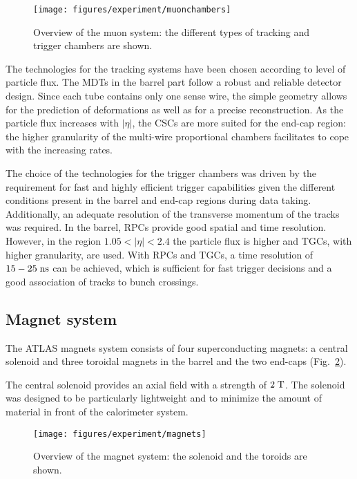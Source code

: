 \begin{figure}[ht]
\begin{center}
\texttt{[image: figures/experiment/muonchambers]}
\caption[Overview of the muon system]{
  Overview of the muon system:
  the different types of tracking and trigger chambers are shown.}
\label{fig:muons}
\end{center}
\end{figure}

The technologies for the tracking systems have been chosen according to
level of particle flux.
The MDTs in the barrel part follow a robust and reliable detector design.
Since each tube contains only one sense wire, the simple geometry
allows for the prediction of deformations as well as for a precise reconstruction.
As the particle flux increases with $|\eta|$, 
the CSCs are more suited for the end-cap region:
the higher granularity of the multi-wire proportional chambers 
facilitates to cope with the increasing rates.

The choice of the technologies for the trigger chambers was driven 
by the requirement for fast and highly efficient trigger capabilities
given the different conditions present in the barrel and end-cap regions during data taking.
Additionally, an adequate resolution of the transverse momentum of the tracks was required.
In the barrel, RPCs provide good spatial and time resolution.
However, in the region \mbox{$1.05 < |\eta| < 2.4$}  the particle flux
is higher and TGCs, with higher granularity, are used.
With RPCs and TGCs, a time resolution of \mbox{$15 - 25 \; \mathrm{ns}$} can be
achieved, 
which is sufficient for fast trigger decisions and a good association of
tracks to bunch crossings.

\subsection{Magnet system}
\label{sec:magnets}

The ATLAS magnets system consists of four superconducting
magnets: a central solenoid and three toroidal magnets in the barrel and the
two end-caps (Fig.~\ref{fig:magnets}).

The central solenoid provides an axial field with a strength of \mbox{$2 \; \mathrm{T}$}.
The solenoid was designed to be particularly lightweight and to
minimize the amount of material in front of the calorimeter system.

\begin{figure}[ht]
\begin{center}
\texttt{[image: figures/experiment/magnets]}
\caption[Overview of the magnet system]{
  Overview of the magnet system:
  the solenoid and the toroids are shown.}
\label{fig:magnets}
\end{center}
\end{figure}

